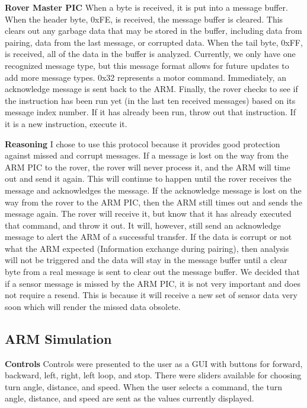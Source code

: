 {\textbf{Rover Master PIC}
When a byte is received, it is put into a message buffer. When the header byte, 0xFE, is received, the message buffer is cleared. This clears out any garbage data that may be stored in the buffer, including data from pairing, data from the last message, or corrupted data. When the tail byte, 0xFF, is received, all of the data in the buffer is analyzed.
Currently, we only have one recognized message type, but this message format allows for future updates to add more message types. 0x32 represents a motor command. Immediately, an acknowledge message is sent back to the ARM.
Finally, the rover checks to see if the instruction has been run yet (in the last ten received messages) based on its message index number. If it has already been run, throw out that instruction. If it is a new instruction, execute it.

\textbf{Reasoning}
I chose to use this protocol because it provides good protection against missed and corrupt messages.
If a message is lost on the way from the ARM PIC to the rover, the rover will never process it, and the ARM will time out and send it again. This will continue to happen until the rover receives the message and acknowledges the message.
If the acknowledge message is lost on the way from the rover to the ARM PIC, then the ARM still times out and sends the message again. The rover will receive it, but know that it has already executed that command, and throw it out. It will, however, still send an acknowledge message to alert the ARM of a successful transfer.
If the data is corrupt or not what the ARM expected (Information exchange during pairing), then analysis will not be triggered and the data will stay in the message buffer until a clear byte from a real message is sent to clear out the message buffer.
We decided that if a sensor message is missed by the ARM PIC, it is not very important and does not require a resend. This is because it will receive a new set of sensor data very soon which will render the missed data obsolete.

\subsection{ARM Simulation}
\textbf{Controls}
Controls were presented to the user as a GUI with buttons for forward, backward, left, right, left loop, and stop. There were sliders available for choosing turn angle, distance, and speed. When the user selects a command, the turn angle, distance, and speed are sent as the values currently displayed.

}
